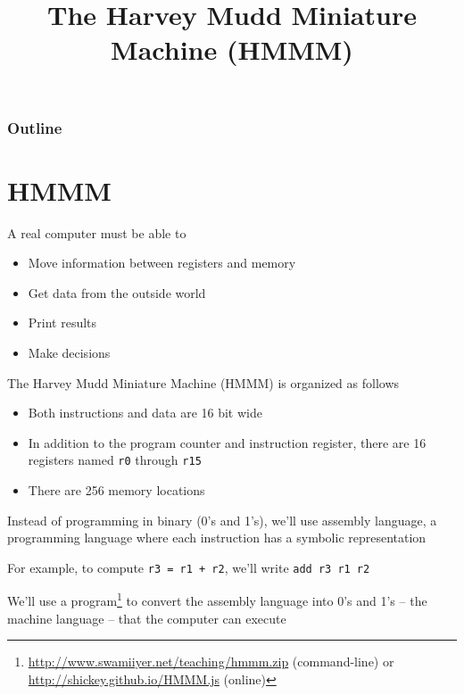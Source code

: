 \documentclass[8pt,a4paper,compress]{beamer}
\title{The Harvey Mudd Miniature Machine (HMMM)}
\date{}
\begin{document}
\begin{frame}
\vfill
\titlepage
\end{frame}

\begin{frame}
\frametitle{Outline}
\tableofcontents
\end{frame}

\section{HMMM}
\begin{frame}[fragile]
\pause

A real computer must be able to
\begin{itemize}
\item Move information between registers and memory
\item Get data from the outside world
\item Print results
\item Make decisions
\end{itemize}

\pause
\bigskip

The Harvey Mudd Miniature Machine (HMMM) is organized as follows
\begin{itemize}
\item Both instructions and data are 16 bit wide
\item In addition to the program counter and instruction register, there are 16 registers named \lstinline{r0} through \lstinline{r15}
\item There are 256 memory locations
\end{itemize}

\pause
\bigskip

Instead of programming in binary (0's and 1's), we'll use assembly language, a programming language where each instruction has a symbolic representation

\pause
\bigskip

For example, to compute \lstinline{r3 = r1 + r2}, we'll write \lstinline{add r3 r1 r2}

\pause
\bigskip

We'll use a program\footnote{\href{http://www.swamiiyer.net/teaching/hmmm.zip}{http://www.swamiiyer.net/teaching/hmmm.zip} (command-line) or \href{http://shickey.github.io/HMMM.js}{http://shickey.github.io/HMMM.js} (online)} to convert the assembly language into 0's and 1's -- the machine language -- that the computer can execute
\end{frame}
\end{document}
